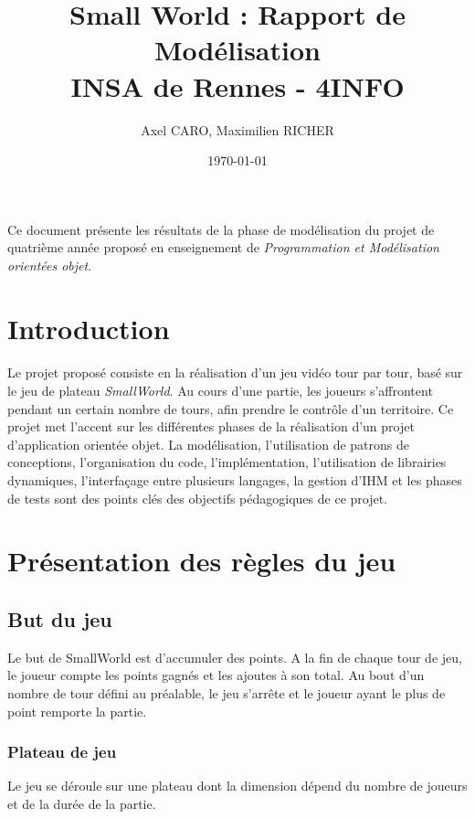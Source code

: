 \documentclass[a4paper]{article}
\title{Small World : Rapport de Modélisation \\ INSA de Rennes - 4INFO}
\author{Axel CARO, Maximilien RICHER}
\date{\today}
\begin{document}
\maketitle

\paragraph{}
Ce document présente les résultats de la phase de modélisation du projet de quatrième année proposé en enseignement de \textit{Programmation et Modélisation orientées objet}.

\section*{Introduction}
\paragraph{}
Le projet proposé consiste en la réalisation d'un jeu vidéo tour par tour, basé sur le jeu de plateau \textit{SmallWorld}. Au cours d'une partie, les joueurs s'affrontent pendant un certain nombre de tours, afin prendre le contrôle d'un territoire. Ce projet met l'accent sur les différentes phases de la réalisation d'un projet d'application orientée objet. La modélisation, l'utilisation de patrons de conceptions, l'organisation du code, l'implémentation, l'utilisation de librairies dynamiques, l'interfaçage entre plusieurs langages, la gestion d'IHM et les phases de tests sont des points clés des objectifs pédagogiques de ce projet.

\section{Présentation des règles du jeu}

\subsection{But du jeu}
Le but de SmallWorld est d'accumuler des points. A la fin de chaque tour de jeu, le joueur compte les points gagnés et les ajoutes à son total. Au bout d'un nombre de tour défini au préalable, le jeu s'arrête et le joueur ayant le plus de point remporte la partie.
\subsubsection{Plateau de jeu}
Le jeu se déroule sur une plateau dont la dimension dépend du nombre de joueurs et de la durée de la partie.
\end{document}
